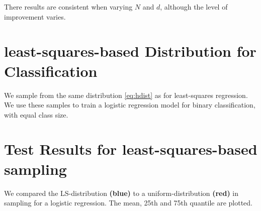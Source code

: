 \documentclass{article}
\begin{document}
There results are consistent when varying $N$ and $d$, although the level of improvement varies.
%
\section{least-squares-based Distribution for Classification}

We sample from the same distribution \eqref{eq:hdist} as for least-squares regression. We use these samples to train a logistic regression model for binary classification, with equal class size.
 
  
\section{Test Results for least-squares-based sampling}
We compared the LS-distribution {\bf\color{blue}(blue)} to a uniform-distribution {\bf\color{red}(red)} in sampling for a logistic regression. The mean, 25th and 75th quantile are plotted.
\end{document}
